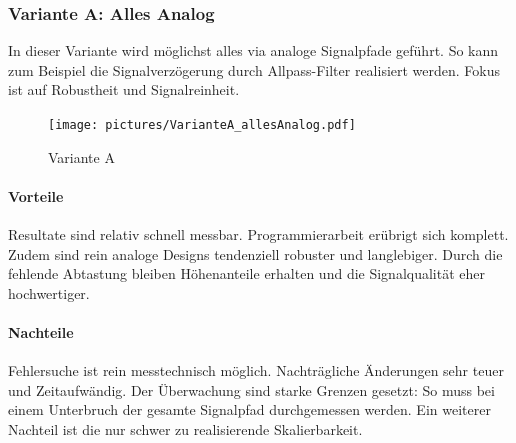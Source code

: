 \subsubsection{Variante A: Alles Analog}
In dieser Variante wird möglichst alles via analoge Signalpfade geführt. So kann zum Beispiel die Signalverzögerung durch Allpass-Filter realisiert werden. Fokus ist auf Robustheit und Signalreinheit.
\begin{figure}[H]
	\centering
	\texttt{[image: pictures/VarianteA\_allesAnalog.pdf]}
	\caption{Variante A}
\end{figure}
\paragraph{Vorteile} Resultate sind relativ schnell messbar. Programmierarbeit erübrigt sich komplett. Zudem sind rein analoge Designs tendenziell robuster und langlebiger. Durch die fehlende Abtastung bleiben Höhenanteile erhalten und die Signalqualität eher hochwertiger.
\paragraph{Nachteile} Fehlersuche ist rein messtechnisch möglich. Nachträgliche Änderungen sehr teuer und Zeitaufwändig. Der Überwachung sind starke Grenzen gesetzt: So muss bei einem Unterbruch der gesamte Signalpfad durchgemessen werden. Ein weiterer Nachteil ist die nur schwer zu realisierende Skalierbarkeit.
\newpage
